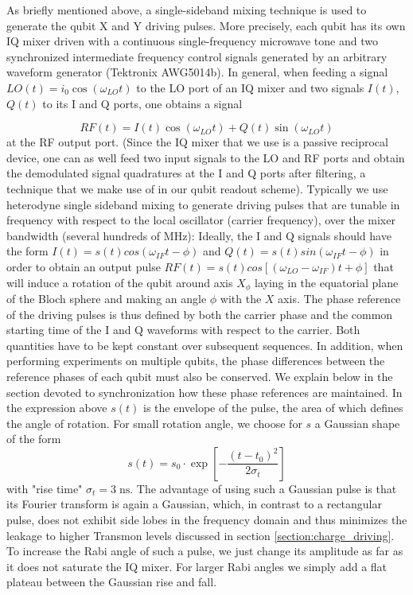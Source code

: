 As briefly mentioned above, a single-sideband mixing technique is used to generate the qubit X and Y driving pulses. More precisely, each qubit has its own IQ mixer driven with a continuous single-frequency microwave tone and two synchronized intermediate frequency control signals generated by an arbitrary waveform generator (Tektronix AWG5014b). In general, when feeding a signal $LO(t) = i_0 \cos{(\omega_{LO} t )}$ to the LO port of an IQ mixer and two signals $I(t)$, $Q(t)$ to its I and Q ports, one obtains a signal

\begin{equation}
RF(t) = I(t)\cos{(\omega_{LO} t)}+Q(t)\sin{(\omega_{LO} t)} \label{eq:iqMixer}
\end{equation}
at the RF output port. (Since the IQ mixer that we use is a passive reciprocal device, one can as well feed two input signals to the LO and RF ports and obtain the demodulated signal quadratures at the I and Q ports after filtering, a technique that we make use of in our qubit readout scheme). Typically we use heterodyne single sideband mixing to generate driving pulses that are tunable in frequency with respect to the local oscillator (carrier  frequency), over the mixer bandwidth (several hundreds of MHz): Ideally, the I and Q signals should have the form $I(t)=s(t)cos(\omega_{IF} t-\phi)$ and $Q(t)=s(t)sin(\omega_{IF} t-\phi)$ in order to obtain an output pulse $RF(t)=s(t)cos[(\omega_{LO}-\omega_{IF})t +\phi]$ that will induce a rotation of the qubit around axis $X_{\phi}$ laying in the equatorial plane of the Bloch sphere and making an angle $\phi$ with the $X$ axis. The phase reference of the driving pulses is thus defined by both the carrier phase and the common starting time of the I and Q waveforms with respect to the carrier. Both quantities have to be kept constant over subsequent sequences. In addition, when performing experiments on multiple qubits, the phase differences between the reference phases of each qubit must also be conserved.  We explain below in the section devoted to synchronization how these phase references are maintained. In the expression above $s(t)$ is the envelope of the pulse, the area of which defines the angle of rotation. For small rotation angle, we choose for $s$ a Gaussian shape of the form
%
\begin{equation}
s(t) = s_0\cdot\exp{\left[-\frac{(t-t_0)^2}{2\sigma_t}\right]}
\end{equation}
%
with "rise time" $\sigma_t=3\;\mathrm{ns}$. The advantage of using such a Gaussian pulse \citep{bauer_gaussian_1984} is that its Fourier transform is again a Gaussian, which, in contrast to a rectangular pulse, does not exhibit side lobes in the frequency domain and thus minimizes the leakage to higher Transmon levels discussed in section \ref{section:charge_driving}. To increase the Rabi angle of such a pulse, we just change its amplitude as far as it does not saturate the IQ mixer. For larger Rabi angles we simply add a flat plateau between the Gaussian rise and fall.

